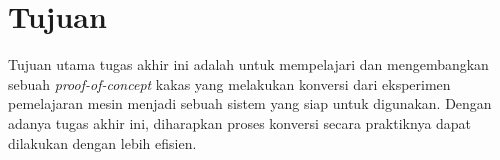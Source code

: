 \section{Tujuan}

Tujuan utama tugas akhir ini adalah untuk mempelajari dan mengembangkan sebuah \textit{proof-of-concept} kakas yang melakukan konversi dari eksperimen pemelajaran mesin menjadi sebuah sistem yang siap untuk digunakan.
Dengan adanya tugas akhir ini, diharapkan proses konversi secara praktiknya dapat dilakukan dengan lebih efisien.
